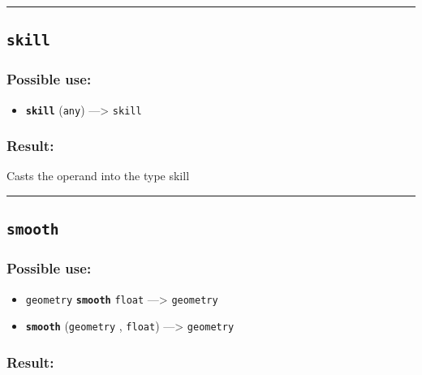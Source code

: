 \documentclass[]{book}
\providecommand{\tightlist}{%
  \setlength{\itemsep}{0pt}\setlength{\parskip}{0pt}}
\theoremstyle{definition}
\theoremstyle{definition}
\theoremstyle{definition}
\theoremstyle{remark}
\begin{document}
\begin{center}\rule{0.5\linewidth}{\linethickness}\end{center}

\subsection{\texorpdfstring{\texttt{skill}}{skill}}\label{skill}

\subsubsection{Possible use:}\label{possible-use-483}

\begin{itemize}
\tightlist
\item
  \textbf{\texttt{skill}} (\texttt{any}) ---\textgreater{}
  \texttt{skill}
\end{itemize}

\subsubsection{Result:}\label{result-467}

Casts the operand into the type skill

\begin{center}\rule{0.5\linewidth}{\linethickness}\end{center}

\subsection{\texorpdfstring{\texttt{smooth}}{smooth}}\label{smooth}

\subsubsection{Possible use:}\label{possible-use-484}

\begin{itemize}
\tightlist
\item
  \texttt{geometry} \textbf{\texttt{smooth}} \texttt{float}
  ---\textgreater{} \texttt{geometry}
\item
  \textbf{\texttt{smooth}} (\texttt{geometry} , \texttt{float})
  ---\textgreater{} \texttt{geometry}
\end{itemize}

\subsubsection{Result:}\label{result-468}
\end{document}
